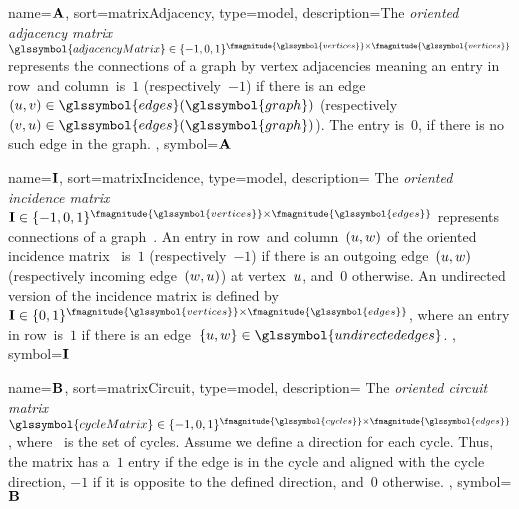 {
    name={\ensuremath{ \adjacencyMatrix }},
    sort={matrixAdjacency},
    type={model},
    description={The \emph{oriented adjacency
    matrix}~$\glssymbol{adjacencyMatrix}\in\{-1, 0,
    1\}^{\fmagnitude{\glssymbol{vertices}}\times\fmagnitude{
    \glssymbol{vertices}}}$ represents the connections of a graph by vertex
    adjacencies meaning an entry in row~\vertexa and column~\vertexb is~$1$
    (respectively~$-1$) if there is an edge~$(\vertexa,\vertexb)\in
    \glssymbol{edges}(\glssymbol{graph})$ (respectively~$
    (\vertexb,\vertexa)\in\glssymbol{edges}(\glssymbol{graph})$). The entry
    is~$0$, if there is no such edge in the graph.
    }, 
    symbol={\ensuremath{\adjacencyMatrix }} 
}

{
    name={\ensuremath{ \incidenceMatrix }},
    sort={matrixIncidence},
    type={model},
    description={
    The \emph{oriented incidence matrix}~$\incidenceMatrix\in\{-1,0,1\}^{
    \fmagnitude{\glssymbol{vertices}}\times\fmagnitude{\glssymbol{edges}}}$
    represents connections of a graph~. An entry in
    row~\vertexa and column~$(u,w)$ of the oriented incidence
    matrix~ is~$1$ (respectively~$-1$) if there is
    an outgoing edge~$(u,w)$ (respectively incoming
    edge~$(w,u)$) at vertex~$u$, and~$0$ otherwise. An
    undirected version of the incidence matrix is defined
    by~$\incidenceMatrix\in\{0,1\}^{
    \fmagnitude{\glssymbol{vertices}}\times\fmagnitude{\glssymbol{edges}}}$,
    where an entry in row~\vertexa is~$1$ if there is an edge~$
    \{\vertexa,\vertexc\}\in\glssymbol{undirectededges}$.
    },
    symbol={\ensuremath{ \incidenceMatrix }} 
    }

{
    name={\ensuremath{ \cycleMatrix }},
    sort={matrixCircuit},
    type={model},
    description={
        The \emph{oriented circuit matrix}~$\glssymbol{cycleMatrix}\in
        \{-1,0,1\}^{
        \fmagnitude{\glssymbol{cycles}}\times \fmagnitude{\glssymbol{edges}}}$,
        where~ is the set of cycles. Assume we define a
        direction for each cycle. Thus, the matrix has a~$1$ entry if the edge
        is in the cycle and aligned with the cycle direction, $-1$ if it is
        opposite to the defined direction, and~$0$ otherwise.
    },
    symbol={\ensuremath{ \cycleMatrix }}
}

